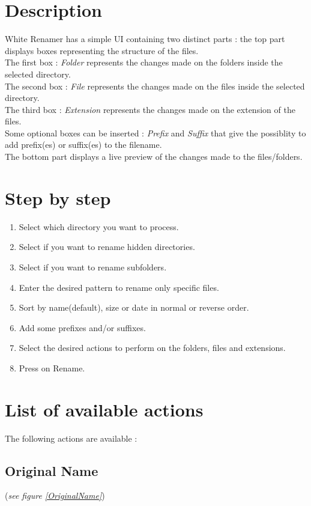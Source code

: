 \documentclass[11pt, a4paper]{scrartcl}
\begin{document}
\section{Description}
White Renamer has a simple UI containing two distinct parts : the top part displays boxes representing the structure of the files. \\
The first box : \emph{Folder} represents the changes made on the folders inside the selected directory.\\
The second box : \emph{File} represents the changes made on the files inside the selected directory.\\
The third box : \emph{Extension} represents the changes made on the extension of the files.\\
Some optional boxes can be inserted : \emph{Prefix} and \emph{Suffix} that give the possiblity to add prefix(es) or suffix(es) to the filename.\\

The bottom part displays a live preview of the changes made to the files/folders.


\section{Step by step}
\begin{enumerate}
        \item Select which directory you want to process.
        \item Select if you want to rename hidden directories.
        \item Select if you want to rename subfolders.
        \item Enter the desired pattern to rename only specific files.
        \item Sort by name(default), size or date in normal or reverse order.
        \item Add some prefixes and/or suffixes.
        \item Select the desired actions to perform on the folders, files and extensions.
        \item Press on Rename.
\end{enumerate}

\section{List of available actions}
The following actions are available :

\subsection*{Original Name}
(\emph{see figure \ref{OriginalName}})\\
\end{document}
